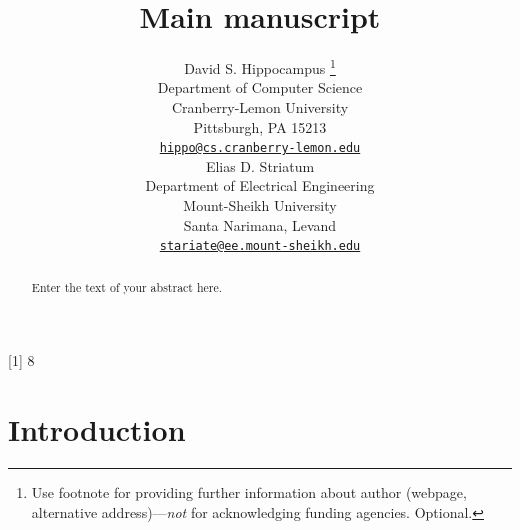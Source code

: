 \documentclass{article}
\title{Main manuscript}
\author{
    David S. Hippocampus
    \thanks{Use footnote for providing further information about author
(webpage, alternative address)---\emph{not} for acknowledging funding
agencies. Optional.}
   \\
    Department of Computer Science \\
    Cranberry-Lemon University \\
  Pittsburgh, PA 15213 \\
  \texttt{\href{mailto:hippo@cs.cranberry-lemon.edu}{\nolinkurl{hippo@cs.cranberry-lemon.edu}}} \\
   \And
    Elias D. Striatum
   \\
    Department of Electrical Engineering \\
    Mount-Sheikh University \\
  Santa Narimana, Levand \\
  \texttt{\href{mailto:stariate@ee.mount-sheikh.edu}{\nolinkurl{stariate@ee.mount-sheikh.edu}}} \\
  }
\begin{document}
\maketitle

\def\tightlist{}


\begin{abstract}
Enter the text of your abstract here.
\end{abstract}


{[}1{]} 8

\hypertarget{introduction}{%
\section{Introduction}\label{introduction}}
\end{document}
